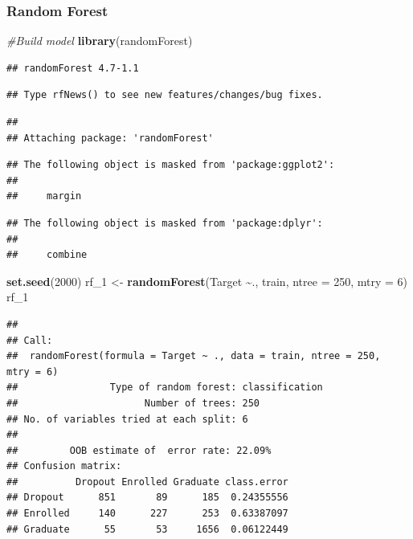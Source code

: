 \documentclass[
]{article}
\newenvironment{Shaded}{\begin{snugshade}}{\end{snugshade}}
\newcommand{\AttributeTok}[1]{\textcolor[rgb]{0.13,0.29,0.53}{#1}}
\newcommand{\CommentTok}[1]{\textcolor[rgb]{0.56,0.35,0.01}{\textit{#1}}}
\newcommand{\DecValTok}[1]{\textcolor[rgb]{0.00,0.00,0.81}{#1}}
\newcommand{\FunctionTok}[1]{\textcolor[rgb]{0.13,0.29,0.53}{\textbf{#1}}}
\newcommand{\NormalTok}[1]{#1}
\newcommand{\OtherTok}[1]{\textcolor[rgb]{0.56,0.35,0.01}{#1}}
\newcommand{\SpecialCharTok}[1]{\textcolor[rgb]{0.81,0.36,0.00}{\textbf{#1}}}
\begin{document}
\hypertarget{random-forest}{%
\subsubsection{Random Forest}\label{random-forest}}

\begin{Shaded}
\begin{Highlighting}[]
\CommentTok{\#Build model}
\FunctionTok{library}\NormalTok{(randomForest)}
\end{Highlighting}
\end{Shaded}

\begin{verbatim}
## randomForest 4.7-1.1
\end{verbatim}

\begin{verbatim}
## Type rfNews() to see new features/changes/bug fixes.
\end{verbatim}

\begin{verbatim}
## 
## Attaching package: 'randomForest'
\end{verbatim}

\begin{verbatim}
## The following object is masked from 'package:ggplot2':
## 
##     margin
\end{verbatim}

\begin{verbatim}
## The following object is masked from 'package:dplyr':
## 
##     combine
\end{verbatim}

\begin{Shaded}
\begin{Highlighting}[]
\FunctionTok{set.seed}\NormalTok{(}\DecValTok{2000}\NormalTok{)}
\NormalTok{rf\_1 }\OtherTok{\textless{}{-}} \FunctionTok{randomForest}\NormalTok{(Target }\SpecialCharTok{\textasciitilde{}}\NormalTok{., train, }\AttributeTok{ntree =} \DecValTok{250}\NormalTok{, }\AttributeTok{mtry =} \DecValTok{6}\NormalTok{)}
\NormalTok{rf\_1}
\end{Highlighting}
\end{Shaded}

\begin{verbatim}
## 
## Call:
##  randomForest(formula = Target ~ ., data = train, ntree = 250,      mtry = 6) 
##                Type of random forest: classification
##                      Number of trees: 250
## No. of variables tried at each split: 6
## 
##         OOB estimate of  error rate: 22.09%
## Confusion matrix:
##          Dropout Enrolled Graduate class.error
## Dropout      851       89      185  0.24355556
## Enrolled     140      227      253  0.63387097
## Graduate      55       53     1656  0.06122449
\end{verbatim}
\end{document}
